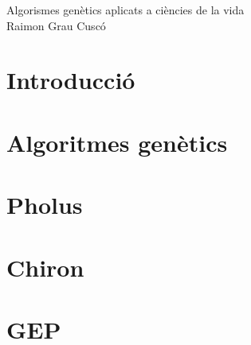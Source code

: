 \documentclass[titlepage,a4paper,12pt]{book}
\begin{document}
\begin{titlepage}
\begin{center}
{\Huge Algorismes genètics aplicats a ciències de la vida}\\[2cm]
{\Large  Raimon Grau Cuscó }\\[5cm]

	\begin{figure}[h]
	\begin{center}
	\end{center}
	\end{figure}

	\begin{figure}[h]
	\begin{center}
	\end{center}
	\end{figure}
\end{center}
\end{titlepage}

\newpage{\pagestyle{empty}\cleardoublepage}


\tableofcontents

\newpage{\pagestyle{empty}\cleardoublepage}

\chapter{Introducció}
%
\chapter{Algoritmes genètics}
	
\chapter{Pholus} %
\label{cha:Pholus}

\chapter{Chiron} %
\label{cha:Chiron}





\chapter{GEP} %
\label{cha:GEP}

\end{document}
